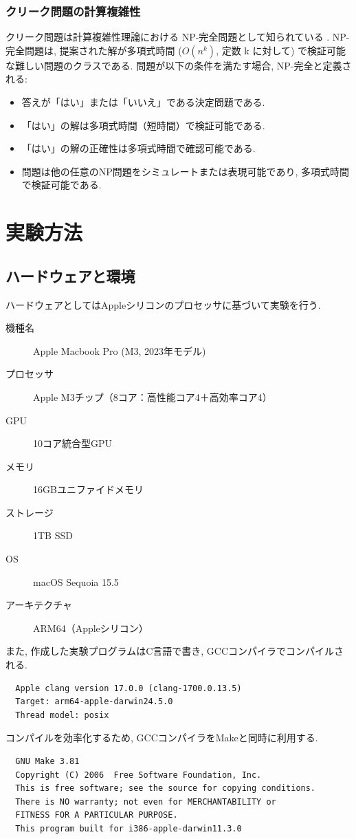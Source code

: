 \documentclass[a4j, 12pt]{jarticle}
\begin{document}
\subsubsection{クリーク問題の計算複雑性}\label{sec:clique-complexity}
クリーク問題は計算複雑性理論における NP-完全問題として知られている \cite{garey1979computers}. NP-完全問題は, 提案された解が多項式時間 ($O(n^k)$, 定数 k に対して) で検証可能な難しい問題のクラスである. 問題が以下の条件を満たす場合, NP-完全と定義される\cite{cormen2009introduction}:
\begin{itemize}
  \item 答えが「はい」または「いいえ」である決定問題である.
  \item 「はい」の解は多項式時間（短時間）で検証可能である.
  \item 「はい」の解の正確性は多項式時間で確認可能である.
  \item 問題は他の任意のNP問題をシミュレートまたは表現可能であり, 多項式時間で検証可能である.
\end{itemize}
\section{実験方法}
\subsection{ハードウェアと環境}
ハードウェアとしてはAppleシリコンのプロセッサに基づいて実験を行う. 
\begin{description}
  \item[機種名] Apple Macbook Pro (M3, 2023年モデル)
  \item[プロセッサ] Apple M3チップ（8コア：高性能コア4＋高効率コア4）
  \item[GPU] 10コア統合型GPU
  \item[メモリ] 16GBユニファイドメモリ
  \item[ストレージ] 1TB SSD
  \item[OS] macOS Sequoia 15.5
  \item[アーキテクチャ] ARM64（Appleシリコン） 
\end{description}
また, 作成した実験プログラムはC言語で書き, GCCコンパイラでコンパイルされる. 
\begin{verbatim}
  Apple clang version 17.0.0 (clang-1700.0.13.5)
  Target: arm64-apple-darwin24.5.0
  Thread model: posix
\end{verbatim}
コンパイルを効率化するため, GCCコンパイラをMakeと同時に利用する. 
\begin{verbatim}
  GNU Make 3.81
  Copyright (C) 2006  Free Software Foundation, Inc.
  This is free software; see the source for copying conditions.
  There is NO warranty; not even for MERCHANTABILITY or 
  FITNESS FOR A PARTICULAR PURPOSE.
  This program built for i386-apple-darwin11.3.0
\end{verbatim}
\end{document}
